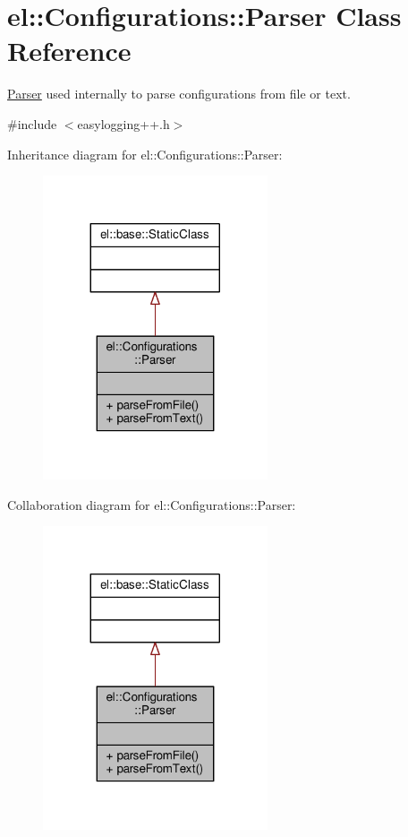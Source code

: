 \hypertarget{classel_1_1Configurations_1_1Parser}{}\section{el\+:\+:Configurations\+:\+:Parser Class Reference}
\label{classel_1_1Configurations_1_1Parser}


\hyperlink{classel_1_1Configurations_1_1Parser}{Parser} used internally to parse configurations from file or text.  




{\ttfamily \#include $<$easylogging++.\+h$>$}



Inheritance diagram for el\+:\+:Configurations\+:\+:Parser\+:
\nopagebreak
\begin{figure}[H]
\begin{center}
\leavevmode
\includegraphics[width=188pt]{de/db8/classel_1_1Configurations_1_1Parser__inherit__graph}
\end{center}
\end{figure}


Collaboration diagram for el\+:\+:Configurations\+:\+:Parser\+:
\nopagebreak
\begin{figure}[H]
\begin{center}
\leavevmode
\includegraphics[width=188pt]{dd/dbe/classel_1_1Configurations_1_1Parser__coll__graph}
\end{center}
\end{figure}
